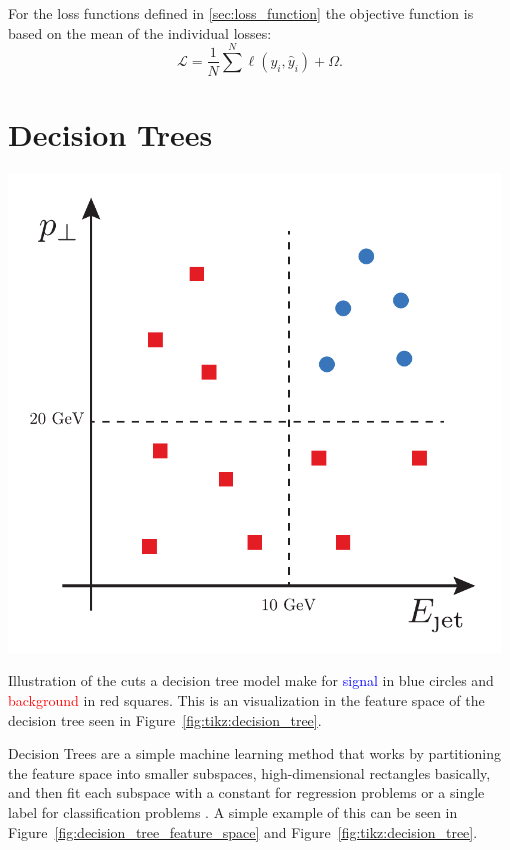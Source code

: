 \documentclass[a4paper, twoside, nobib]{tufte-book}
\begin{document}
For the loss functions defined in \autoref{sec:loss_function} the objective function is based on the mean of the individual losses:
\begin{equation}
  \mathcal{L} = \frac{1}{N} \sum^N \ell(y_i, \hat{y}_i) + \Omega. 
\end{equation}

\section{Decision Trees}
\label{sec:decision_trees}

\begin{marginfigure}[-3cm]
  \includegraphics[width=0.98\textwidth]{figures/decision_tree/tree_example.pdf}%
  \caption[Decision Tree Cuts]{Illustration of the cuts a decision tree model make for \textcolor{blue}{signal} in blue circles and \textcolor{red}{background} in red squares. This is an visualization in the feature space of the decision tree seen in Figure~\ref{fig:tikz:decision_tree}.}
  \label{fig:decision_tree_feature_space}
\end{marginfigure}

Decision Trees are a simple machine learning method that works by partitioning the feature space into smaller subspaces, high-dimensional rectangles basically, and then fit each subspace with a constant for regression problems or a single label for classification problems \citep{hastieElementsStatisticalLearning2009}. A simple example of this can be seen in Figure~\ref{fig:decision_tree_feature_space} and Figure~\ref{fig:tikz:decision_tree}. 
\end{document}
